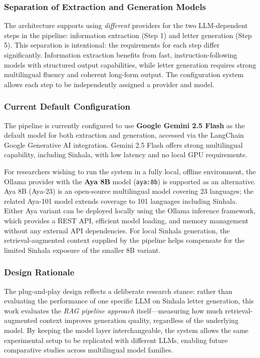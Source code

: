 \documentclass[12pt]{uomthesis}
\begin{document}
\subsubsection{Separation of Extraction and Generation Models}

The architecture supports using \textit{different} providers for the two LLM-dependent steps in the pipeline: information extraction (Step 1) and letter generation (Step 5). This separation is intentional: the requirements for each step differ significantly. Information extraction benefits from fast, instruction-following models with structured output capabilities, while letter generation requires strong multilingual fluency and coherent long-form output. The configuration system allows each step to be independently assigned a provider and model.

\subsubsection{Current Default Configuration}

The pipeline is currently configured to use \textbf{Google Gemini 2.5 Flash} as the default model for both extraction and generation, accessed via the LangChain Google Generative AI integration. Gemini 2.5 Flash offers strong multilingual capability, including Sinhala, with low latency and no local GPU requirements.

For researchers wishing to run the system in a fully local, offline environment, the Ollama provider with the \textbf{Aya 8B} model (\texttt{aya:8b}) is supported as an alternative. Aya 8B (Aya-23) is an open-source multilingual model covering 23 languages; the related Aya-101 model extends coverage to 101 languages including Sinhala. Either Aya variant can be deployed locally using the Ollama inference framework, which provides a REST API, efficient model loading, and memory management without any external API dependencies. For local Sinhala generation, the retrieval-augmented context supplied by the pipeline helps compensate for the limited Sinhala exposure of the smaller 8B variant.

\subsubsection{Design Rationale}

The plug-and-play design reflects a deliberate research stance: rather than evaluating the performance of one specific LLM on Sinhala letter generation, this work evaluates the \textit{RAG pipeline approach} itself—measuring how much retrieval-augmented context improves generation quality, regardless of the underlying model. By keeping the model layer interchangeable, the system allows the same experimental setup to be replicated with different LLMs, enabling future comparative studies across multilingual model families.
\end{document}
